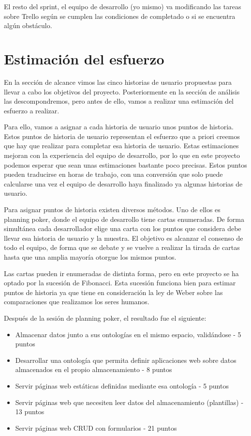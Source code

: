 \documentclass[openright,twoside,12pt]{book}
\begin{document}
El resto del sprint, el equipo de desarrollo (yo mismo) va modificando las tareas sobre Trello según se cumplen las condiciones de completado o si se encuentra algún obstáculo.

\section{Estimación del esfuerzo}

En la sección de alcance vimos las cinco historias de usuario propuestas para llevar a cabo los objetivos del proyecto. Posteriormente en la sección de análisis las descompondremos, pero antes de ello, vamos a realizar una estimación del esfuerzo a realizar.

Para ello, vamos a asignar a cada historia de usuario unos puntos de historia. Estos puntos de historia de usuario representan el esfuerzo que a priori creemos que hay que realizar para completar esa historia de usuario. Estas estimaciones mejoran con la experiencia del equipo de desarrollo, por lo que en este proyecto podemos esperar que sean unas estimaciones bastante poco precisas. Estos puntos pueden traducirse en horas de trabajo, con una conversión que solo puede calcularse una vez el equipo de desarrollo haya finalizado ya algunas historias de usuario.

Para asignar puntos de historia existen diversos métodos. Uno de ellos es planning poker, donde el equipo de desarrollo tiene cartas enumeradas. De forma simultánea cada desarrollador elige una carta con los puntos que considera debe llevar esa historia de usuario y la muestra. El objetivo es alcanzar el consenso de todo el equipo, de forma que se debate y se vuelve a realizar la tirada de cartas hasta que una amplia mayoría otorgue los mismos puntos.

Las cartas pueden ir enumeradas de distinta forma, pero en este proyecto se ha optado por la sucesión de Fibonacci. Esta sucesión funciona bien para estimar puntos de historia ya que tiene en consideración la ley de Weber sobre las comparaciones que realizamos los seres humanos\cite{fibonacci}.

Después de la sesión de planning poker, el resultado fue el siguiente:

\begin{itemize}
    \item Almacenar datos junto a sus ontologías en el mismo espacio, validándose - 5 puntos
    \item Desarrollar una ontología que permita definir aplicaciones web sobre datos almacenados en el propio almacenamiento - 8 puntos
    \item Servir páginas web estáticas definidas mediante esa ontología - 5 puntos
    \item Servir páginas web que necesiten leer datos del almacenamiento (plantillas) - 13 puntos
    \item Servir páginas web CRUD con formularios - 21 puntos
\end{itemize}
\end{document}
